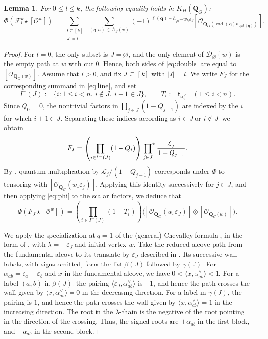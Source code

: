 \documentclass[11pt,a4paper,reqno]{amsart}
\numberwithin{equation}{section}
\newtheorem{lemma}[theorem]{Lemma}
\theoremstyle{definition}
\DeclareMathOperator{\End}{end}
\DeclareMathOperator{\qwt}{qwt}
\newcommand{\QG}{\mathbf Q_G}
\newcommand{\OO}{\mathcal O}
\newcommand{\Sc}[1]{[\OO^{#1}]}
\newcommand{\Si}[1]{[\OO_{\QG(#1)}]}
\newcommand{\qq}{\mathbf q}
\newcommand{\eps}{\varepsilon}
\newcommand{\FF}{\mathcal F}
\newcommand{\wlong}{w_\circ}
\newcommand{\stprod}{\sideset{}{^\star}\prod}
\begin{document}
\begin{lemma}\label{lem:double}
For \(0\le l\le k\), the following equality holds in \(K_{H}(\QG)\):
\begin{equation}\label{eq:double}
 \Phi(\FF^k_l\star\Sc{w})=
 \sum_{\substack{J\subseteq[k]\\|J|=l}}\ 
 \sum_{(\qq,h)\in\mathcal D_J(w)}
    (-1)^{\ell(\qq)-h} e^{-w_h\eps_J}
             \Si{\End(\qq)t_{\qwt(\qq)}} .
\end{equation}
\end{lemma}
\begin{proof}
For \(l=0\), the only subset is \(J=\varnothing\), and the only element of
\(\mathcal D_\varnothing(w)\) is the empty path at \(w\) with cut \(0\).
Hence, both sides of \eqref{eq:double} are equal to \(\Si{w}\).
Assume that \(l>0\), and fix \(J\subseteq[k]\) with \(|J|=l\).
We write \(F_J\) for the corresponding summand in \eqref{eq:line}, and set
\[
 I^-(J):=\{i:1\le i<n,\ i\notin J,\ i+1\in J\},\qquad
 T_i:=\mathsf t_{\alpha_i^\vee}\quad(1\le i<n).
\]
Since \(Q_0=0\), the nontrivial factors in \(\prod_{j\in J}(1-Q_{j-1})\)
are indexed by the \(i\) for which \(i+1\in J\). Separating these indices
according as \(i\in J\) or \(i\notin J\), we obtain
\[
 F_J=\left(\prod_{i\in I^-(J)}(1-Q_i)\right)
             \stprod_{j\in J}\frac{\mathcal{L}_j}{1-Q_{j-1}}.
\]
By \cite[(3.5)]{MNS2}, quantum multiplication by \(\mathcal{L}_j/(1-Q_{j-1})\)
corresponds under \(\Phi\) to tensoring with
\([\OO_{\QG}(\wlong\eps_j)]\). Applying this identity successively for
\(j\in J\), and then applying \eqref{eq:phi} to the scalar factors, we deduce that 
\begin{equation}\label{eq:operator}
 \Phi(F_J\star\Sc{w})
  =\left(\prod_{i\in I^-(J)}(1-T_i)\right)
    \bigl([\OO_{\QG}(\wlong\eps_J)]\otimes\Si{w}\bigr).
\end{equation}

We apply the specialization at \(q=1\) of the (general) Chevalley formula \cite[Theorem~33]{LNS}, in the form of
\cite[Theorem~5.4]{MNS2}, with \(\lambda=-\eps_J\) and initial vertex \(w\).
Take the reduced alcove path from the fundamental alcove to its translate
by \(\eps_J\) described in \cite[\S5.2]{MNS2}. Its successive
wall labels, with signs omitted, form the list \(\beta(J)\) followed by
\(\gamma(J)\). For \(\alpha_{ab}=\eps_a-\eps_b\) and \(x\) in the
fundamental alcove, we have \(0<\langle x,\alpha_{ab}^\vee\rangle<1\).
For a label \((a,b)\) in \(\beta(J)\), the pairing
\(\langle\eps_J,\alpha_{ab}^\vee\rangle\) is \(-1\), and hence the path
crosses the wall given by \(\langle x,\alpha_{ab}^\vee\rangle=0\) in the
decreasing direction. For a label in \(\gamma(J)\), the pairing is
\(1\), and hence the path crosses the wall given by \(\langle x,\alpha_{ab}^\vee\rangle=1\)
in the increasing direction. The root in the \(\lambda\)-chain is
the negative of the root pointing in the direction of the crossing.
Thus, the signed roots are \(+\alpha_{ab}\) in the first block, and
\(-\alpha_{ab}\) in the second block.


\end{proof}
\end{document}
